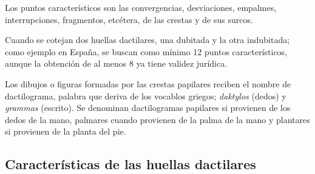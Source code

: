 \documentclass[../principal]{subfiles}
\begin{document}
  Los puntos característicos son las convergencias, desviaciones, empalmes, interrupciones, fragmentos, etcétera, de las crestas y de sus surcos.

  Cuando se cotejan dos huellas dactilares, una dubitada y la otra indubitada; como ejemplo en España, se buscan como mínimo 12 puntos característicos, aunque la obtención de al menos 8 ya tiene validez jurídica.

  Los dibujos o figuras formadas por las crestas papilares reciben el nombre de dactilograma, palabra que deriva de los vocablos griegos; \textsl{daktylos} (dedos) y \textsl{grammas} (escrito). Se denominan dactilogramas papilares si provienen de los dedos de la mano, palmares cuando provienen de la palma de la mano y plantares si provienen de la planta del pie. \cite{articulo:identificacion_forense_comunidades_bacterias}

  \subsection{Características de las huellas dactilares}
\end{document}

